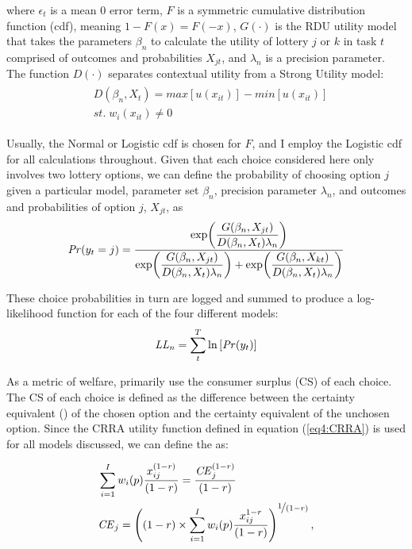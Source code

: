 \documentclass[../main.tex]{subfiles}
\begin{document}
\noindent where $\epsilon_t$ is a mean 0 error term, $F$ is a symmetric cumulative distribution function (cdf), meaning $1 - F(x)  = F(-x)$, $G(\cdot)$ is the RDU utility model that takes the parameters $\beta_n$ to calculate the utility of lottery $j$ or $k$ in task $t$ comprised of outcomes and probabilities $X_{jt}$, and $\lambda_n$ is a precision parameter.
The function $D(\cdot)$ separates contextual utility from a Strong Utility model:
\begin{align}
	\label{eq4:W.cu}
	\begin{split}
		&D(\beta_n,X_t) = \mathit{max}[u(x_{it})] - \mathit{min}[u(x_{it})]\\
		&\mathit{st.}\; w_i(x_{it}) \neq 0
	\end{split}
\end{align}

Usually, the Normal or Logistic cdf is chosen for $F$, and I employ the Logistic cdf for all calculations throughout.
Given that each choice considered here only involves two lottery options, we can define the probability of choosing option $j$ given a particular model, parameter set $\beta_n$, precision parameter $\lambda_n$, and outcomes and probabilities of option $j$, $X_{jt}$, as
\begin{equation}
	\label{eq4:RE.f}
	{\ensuremath{\mathit{Pr}}}(y_t=j) =\dfrac{\exp\!\left( \dfrac{ G(\beta_n,X_{jt}) }{ D(\beta_n,X_{t})\lambda_n }  \right)}{  \exp\!\left( \dfrac{ G(\beta_n,X_{jt}) }{ D(\beta_n,X_{t})\lambda_n }  \right) + \exp\!\left( \dfrac{ G(\beta_n,X_{kt}) }{ D(\beta_n,X_{t})\lambda_n }  \right)    }
\end{equation}

\noindent These choice probabilities in turn are logged and summed to produce a log-likelihood function for each of the four different models:
\begin{equation}
	\label{eq4:ll}
	\mathit{LL_n} = \sum_{t}^T \ln \left[ {\mathit{Pr}}(y_t) \right]
\end{equation}

As a metric of welfare, \textcite{Harrison2016} primarily use the consumer surplus (CS) of each choice.
The CS of each choice is defined as the difference between the certainty equivalent ({\CE}) of the chosen option and the certainty equivalent of the unchosen option.
Since the CRRA utility function defined in equation (\ref{eq4:CRRA}) is used for all models discussed, we can define the {\CE} as:

\begin{align}
	\label{eq4:CEcalc}
	\begin{split}
		&\sum_{i=1}^{I} w_i(p) \frac{x_{ij}^{(1-r)}}{(1-r)} = \frac{ {\mathit{CE}}_j^{(1-r)}}{(1-r)}\\
		&{\mathit{CE}}_j =  \left( (1-r) \times \sum_{i=1}^{I} w_i(p) \frac{x_{ij}^{1-r}}{(1-r)} \right)^{ \displaystyle\nicefrac{1}{(1-r)} } ,
	\end{split}
\end{align}
\end{document}
